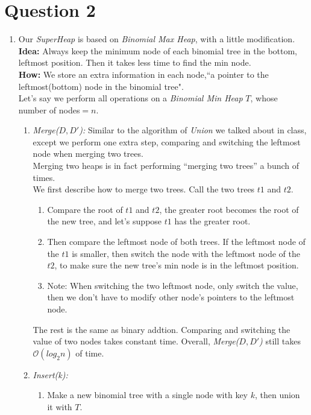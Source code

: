 \documentclass[10pt]{article}
\begin{document}
\section*{Question 2}
\begin{enumerate}
\item
Our \textit{SuperHeap} is based on \textit{Binomial Max Heap}, with a little modification.\\
\textbf{Idea:} Always keep the minimum node of each binomial tree in the bottom, leftmost position. Then it takes less time to find the min node.\\
\textbf{How:} We store an extra information in each node,``a pointer to the leftmost(bottom) node in the binomial tree".\\
Let's say we perform all operations on a \textit{Binomial Min Heap} $T$, whose number of nodes$=n$.
\begin{enumerate}
\item \textit{Merge($D, D'$):}
Similar to the algorithm of \textit{Union} we talked about in class, except we perform one extra step, comparing and switching the leftmost node when merging two trees.\\
Merging two heaps is in fact performing ``merging two trees'' a bunch of times. \\
We first describe how to merge two trees. Call the two trees $t1$ and $t2$.
\begin{enumerate}
\item Compare the root of $t1$ and $t2$, the greater root becomes the root of the new tree, and let's suppose $t1$ has the greater root.
\item Then compare the leftmost node of both trees. If the leftmost node of the $t1$ is smaller, then switch the node with the leftmost node of the $t2$, to make sure the new tree's min node is in the leftmost position.
\item Note: When switching the two leftmost node, only switch the value, then we don't have to modify other node's pointers to the leftmost node.
\end{enumerate}
The rest is the same as binary addtion. 
Comparing and switching the value of two nodes takes constant time. Overall, \textit{Merge($D, D'$)} still takes $\mathcal{O}(log_2n)$ of time.
\item \textit{Insert(k):} 
\begin{enumerate}
\item Make a new binomial tree with a single node with key $k$, then union it with $T$. 


\end{enumerate}
\end{enumerate}
\end{enumerate}
\end{document}

